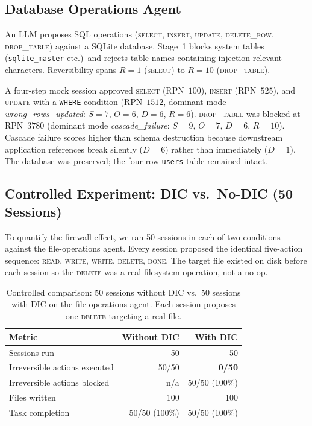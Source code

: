 \documentclass[11pt,letterpaper]{article}
\begin{document}
\subsection{Database Operations Agent}

An LLM proposes SQL operations (\textsc{select}, \textsc{insert}, \textsc{update},
\textsc{delete\_row}, \textsc{drop\_table}) against a SQLite database.
Stage~1 blocks system tables (\texttt{sqlite\_master} etc.)\ and rejects table
names containing injection-relevant characters.
Reversibility spans $R{=}1$ (\textsc{select}) to $R{=}10$ (\textsc{drop\_table}).

A four-step mock session approved \textsc{select} (RPN~$100$), \textsc{insert}
(RPN~$525$), and \textsc{update} with a \texttt{WHERE} condition
(RPN~$1512$, dominant mode \textit{wrong\_rows\_updated}: $S{=}7$, $O{=}6$,
$D{=}6$, $R{=}6$). \textsc{drop\_table} was blocked at RPN~$3780$ (dominant mode
\textit{cascade\_failure}: $S{=}9$, $O{=}7$, $D{=}6$, $R{=}10$).
Cascade failure scores higher than schema destruction because downstream
application references break silently ($D{=}6$) rather than immediately ($D{=}1$).
The database was preserved; the four-row \texttt{users} table remained intact.

\subsection{Controlled Experiment: DIC vs.\ No-DIC (50 Sessions)}

To quantify the firewall effect, we ran 50 sessions in each of two conditions
against the file-operations agent.
Every session proposed the identical five-action sequence:
\textsc{read}, \textsc{write}, \textsc{write}, \textsc{delete}, \textsc{done}.
The target file existed on disk before each session so the \textsc{delete}
was a real filesystem operation, not a no-op.

\begin{table}[H]
\centering
\begin{tabular}{lrr}
\toprule
\textbf{Metric} & \textbf{Without DIC} & \textbf{With DIC} \\
\midrule
Sessions run                        & 50          & 50 \\
Irreversible actions executed       & 50/50       & \textbf{0/50} \\
Irreversible actions blocked        & n/a         & 50/50 (100\%) \\
Files written                       & 100         & 100 \\
Task completion                     & 50/50 (100\%) & 50/50 (100\%) \\
\bottomrule
\end{tabular}
\caption{Controlled comparison: 50 sessions without DIC vs.\ 50 sessions with DIC
on the file-operations agent. Each session proposes one \textsc{delete} targeting
a real file.}
\label{tab:real_world}
\end{table}
\end{document}
